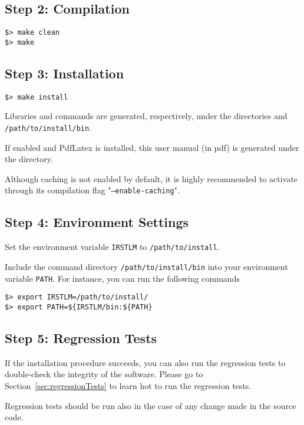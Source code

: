 \subsection{Step 2: Compilation}

\begin{verbatim}
$> make clean
$> make
\end{verbatim}

\subsection{Step 3: Installation}
\begin{verbatim}
$> make install
\end{verbatim}

\noindent
Libraries and commands are generated,  respectively, under the directories and {\tt /path/to/install/bin}.

\noindent
If enabled and PdfLatex is installed, this user manual (in pdf) is generated under the directory.

\noindent
Although caching is not enabled by default, it is highly recommended to activate through its compilation flag "{\tt --enable-caching}".


\subsection{Step 4: Environment Settings}
Set the environment variable {\tt IRSTLM} to {\tt /path/to/install}.

\noindent
Include the command directory {\tt /path/to/install/bin} into your environment variable {\tt PATH}.
For instance, you can run the following commands

\begin{verbatim}
$> export IRSTLM=/path/to/install/
$> export PATH=${IRSTLM/bin:${PATH}
\end{verbatim}



\subsection{Step 5: Regression Tests}
If the installation procedure succeeds, you can also run the regression tests to double-check the integrity of the software.
Please go to Section~\ref{sec:regressionTests} to learn hot to run the regression tests.

\noindent Regression tests should be run also in the case of any change made in the source code.
